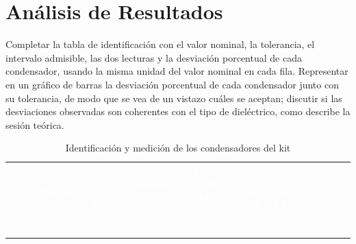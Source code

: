 \documentclass[12pt]{article}
\begin{document}
\section{Análisis de Resultados}\label{sec:analisis}
Completar la tabla de identificación con el valor nominal, la tolerancia, el intervalo admisible, las dos lecturas y la desviación porcentual de cada condensador, usando la misma unidad del valor nominal en cada fila.
\lineablanco
Representar en un gráfico de barras la desviación porcentual de cada condensador junto con su tolerancia, de modo que se vea de un vistazo cuáles se aceptan; discutir si las desviaciones observadas son coherentes con el tipo de dieléctrico, como describe la sesión teórica.
\begin{table}[H]
  \centering
  \caption{Identificación y medición de los condensadores del kit}
  \label{tab:registro-1}
  \begin{tabularx}{\linewidth}{>{\raggedright\arraybackslash}X>{\raggedright\arraybackslash}X>{\raggedright\arraybackslash}X>{\raggedright\arraybackslash}X>{\raggedright\arraybackslash}X>{\raggedright\arraybackslash}X>{\raggedright\arraybackslash}X}
    \rowcolor{iubnavy} \textcolor{white}{\textbf{Ref.}} & \textcolor{white}{\textbf{Marcado}} & \textcolor{white}{\textbf{Cn (nF o \textmu{}F)}} & \textcolor{white}{\textbf{Tolerancia (\%)}} & \textcolor{white}{\textbf{Cm LCR (nF o \textmu{}F)}} & \textcolor{white}{\textbf{Cm multímetro (nF o \textmu{}F)}} & \textcolor{white}{\textbf{e (\%)}} \\
    \rule{0pt}{0.8cm} & & & & & & \\
    \rowcolor{iubfondogris} \rule{0pt}{0.8cm} & & & & & & \\
    \rule{0pt}{0.8cm} & & & & & & \\
    \rowcolor{iubfondogris} \rule{0pt}{0.8cm} & & & & & & \\
    \rule{0pt}{0.8cm} & & & & & & \\
    \bottomrule
  \end{tabularx}
\end{table}
\end{document}
